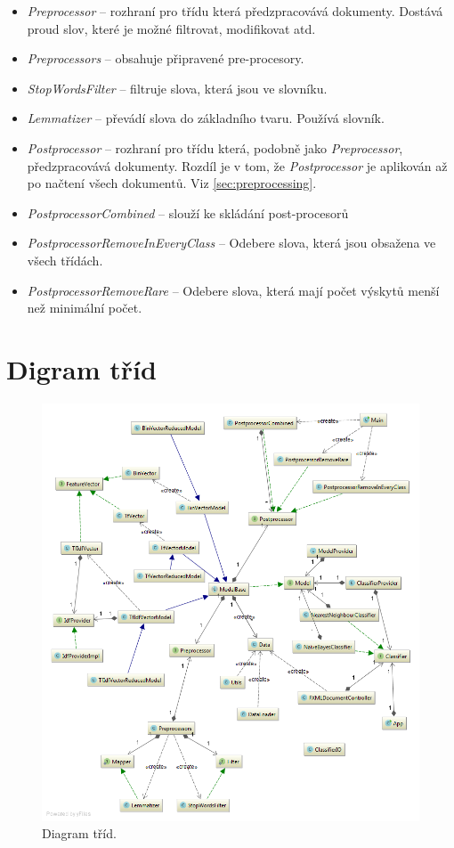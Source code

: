 \documentclass[12pt, a4paper]{report}
\begin{document}
\begin{itemize}
	\item \emph{Preprocessor} -- rozhraní pro třídu která předzpracovává dokumenty. Dostává proud slov, které je možné filtrovat, modifikovat atd.
	\item \emph{Preprocessors} -- obsahuje připravené pre-procesory.
	\item \emph{StopWordsFilter} -- filtruje slova, která jsou ve slovníku.
	\item \emph{Lemmatizer} -- převádí slova do základního tvaru. Používá slovník.

	\item \emph{Postprocessor} -- rozhraní pro třídu která, podobně jako \emph{Preprocessor}, předzpracovává dokumenty. Rozdíl je v tom, že \emph{Postprocessor} je aplikován až po načtení všech dokumentů. Viz \ref{sec:preprocessing}.
	\item \emph{PostprocessorCombined} -- slouží ke skládání post-procesorů
	\item \emph{PostprocessorRemoveInEveryClass} -- Odebere slova, která jsou obsažena ve všech třídách.
	\item \emph{PostprocessorRemoveRare} -- Odebere slova, která mají počet výskytů menší než minimální počet.
\end{itemize}

\section{Digram tříd}
\begin{figure}[H]
	\centering
	\includegraphics[width=1\linewidth]{img-uml}
	\caption{Diagram tříd.}
	\label{fig:img-uml}
\end{figure}
\end{document}
